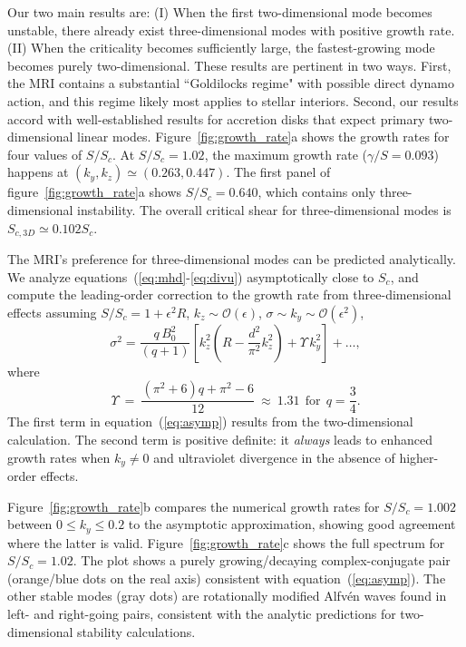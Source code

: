 \documentclass[aps,prl,reprint,superscriptaddress]{revtex4-1}
\newcommand{\SSC}{S/S_{c}}
\begin{document}
Our two main results are: 
(I) When the first two-dimensional mode becomes unstable, there already exist three-dimensional modes with positive growth rate. 
(II) When the criticality becomes sufficiently large, the fastest-growing mode becomes purely two-dimensional. 
These results are pertinent in two ways. 
First, the MRI contains a substantial ``Goldilocks regime" with possible direct dynamo action, and this regime likely most applies to stellar interiors. 
Second, our results accord with well-established results for accretion disks that expect primary two-dimensional linear modes.
Figure~\ref{fig:growth_rate}a shows the growth rates for four values of $\SSC$. 
At $\SSC = 1.02$, the maximum growth rate ($\gamma/S = 0.
093$) happens at $(k_y, k_z) \simeq (0.263, 0.447)$.
The first panel of figure~\ref{fig:growth_rate}a shows $\SSC = 0.640$, which contains only three-dimensional instability.
The overall critical shear for three-dimensional modes is $S_{c,3D} \simeq 0.102 S_c$.

The MRI's preference for three-dimensional modes can be predicted analytically.
We analyze equations~(\ref{eq:mhd}-\ref{eq:divu}) asymptotically close to $S_{c}$, and compute the leading-order correction to the growth rate from three-dimensional effects assuming $\SSC = 1 + \epsilon^{2} R$, $k_{z} \sim \mathcal{O}(\epsilon)$, $\sigma \sim k_{y} \sim \mathcal{O}(\epsilon^{2})$, 
\begin{equation}
  \label{eq:asymp}
\sigma^{2} =  \frac{q\,B_{0}^{2}}{(q+1)} \left[ k_z^2 \left( R - \frac{d^2}{\pi^{2}} k_z^2 \right)  +  \Upsilon \, k_{y}^{2}  \right] +  \ldots,
\end{equation}
where
\begin{equation}
\Upsilon \ = \ \frac{\left(\pi ^2+6\right) q+\pi^2-6}{12 }\  \approx \ 1.31 \ \  \text{for}  \ \  q = \frac{3}{4}.
\end{equation}
The first term in equation~(\ref{eq:asymp}) results from the two-dimensional calculation.
The second term is positive definite: it \emph{always} leads to enhanced growth rates when $k_y \neq 0$ and ultraviolet divergence in the absence of higher-order effects.

Figure~\ref{fig:growth_rate}b compares the numerical growth rates for $\SSC=1.002$ between $0 \le k_y \le 0.2$ to the asymptotic approximation, showing good agreement where the latter is valid.
Figure~\ref{fig:growth_rate}c shows the full spectrum for $\SSC = 1.02$.
The plot shows a purely growing/decaying complex-conjugate pair (orange/blue dots on the real axis) consistent with equation~(\ref{eq:asymp}).
The other stable modes (gray dots) are rotationally modified Alfv\'{e}n waves found in left- and right-going pairs, consistent with the analytic predictions for two-dimensional stability calculations.
\end{document}
